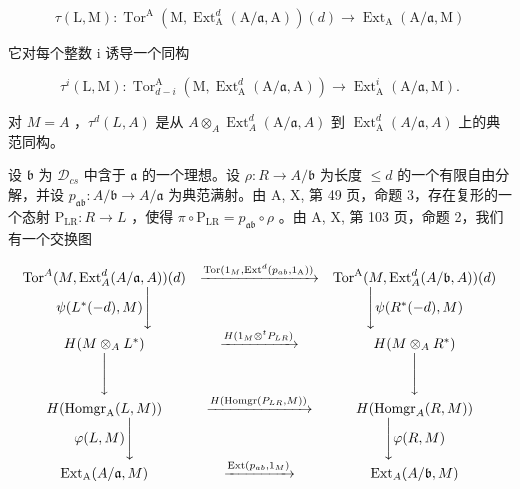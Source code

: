 \[
\tau (\mathrm{L}, \mathrm{M}): \operatorname{Tor} ^ {\mathrm{A}} (\mathrm{M}, \operatorname{Ext} _ {\mathrm{A}} ^ {d} (\mathrm{A} / \mathfrak {a}, \mathrm{A})) (d) \longrightarrow \operatorname{Ext} _ {\mathrm{A}} (\mathrm{A} / \mathfrak {a}, \mathrm{M})
\]

它对每个整数 i 诱导一个同构

\[
\tau^ {i} (\mathrm{L}, \mathrm{M}): \operatorname{Tor} _ {d - i} ^ {\mathrm{A}} (\mathrm{M}, \operatorname{Ext} _ {\mathrm{A}} ^ {d} (\mathrm{A} / \mathfrak {a}, \mathrm{A})) \longrightarrow \operatorname{Ext} _ {\mathrm{A}} ^ {i} (\mathrm{A} / \mathfrak {a}, \mathrm{M}).
\]

对 \(M = A\) ，\(\tau^d(L, A)\) 是从 \(A \otimes_A \operatorname{Ext}_A^d(\mathrm{A} / \mathfrak{a}, A)\) 到 \(\operatorname{Ext}_\mathrm{A}^d(A / \mathfrak{a}, A)\) 上的典范同构。

设 \(\mathfrak{b}\) 为 \(\mathcal{D}_{cs}\) 中含于 \(\mathfrak{a}\) 的一个理想。设 \(\rho: R \to A/\mathfrak{b}\) 为长度 \(\leqslant d\) 的一个有限自由分解，并设 \(p_{\mathfrak{ab}}: A/\mathfrak{b} \to A/\mathfrak{a}\) 为典范满射。由 A, X, 第 49 页，命题 3，存在复形的一个态射 \(\mathrm{P}_{\mathrm{LR}}: R \to L\) ，使得 \(\pi \circ \mathrm{P}_{\mathrm{LR}} = p_{\mathfrak{ab}} \circ \rho\) 。由 A, X, 第 103 页，命题 2，我们有一个交换图

\[
\begin{array}{c c c} \operatorname{Tor} ^ {A} (M, \operatorname{Ext} _ {A} ^ {d} (A / \mathfrak {a}, A)) (d) & \xrightarrow {\operatorname{Tor} (1 _ {M} , \operatorname{Ext} ^ {d} (p _ {a b} , 1 _ {\mathrm{A}}))} & \operatorname{Tor} ^ {\mathrm{A}} (M, \operatorname{Ext} _ {A} ^ {d} (A / \mathfrak {b}, A)) (d) \\ \psi (L ^ {*} (- d), M) \Bigg \downarrow & & \Bigg \downarrow \psi (R ^ {*} (- d), M) \\ H (M \otimes_ {A} L ^ {*}) & \xrightarrow {H (1 _ {M} \otimes^ {t} P _ {L R})} & H (M \otimes_ {A} R ^ {*}) \\ \Bigg \downarrow & & \Bigg \downarrow \\ H (\operatorname{Homgr} _ {\mathrm{A}} (L, M)) & \xrightarrow {H (\operatorname{Homgr} (P _ {L R} , M))} & H (\operatorname{Homgr} _ {A} (R, M)) \\ \varphi (L, M) \Bigg \downarrow & & \Bigg \downarrow \varphi (R, M) \\ \operatorname{Ext} _ {\mathrm{A}} (A / \mathfrak {a}, M) & \xrightarrow {\operatorname{Ext} (p _ {a b} , 1 _ {M})} & \operatorname{Ext} _ {A} (A / \mathfrak {b}, M) \end{array}
\]

